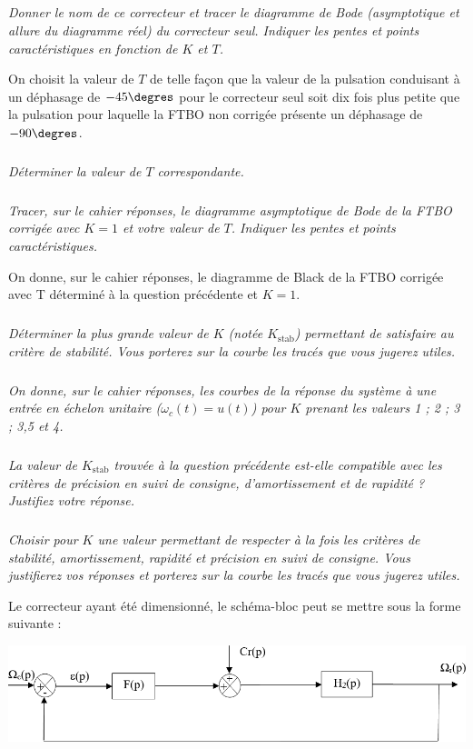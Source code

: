 \documentclass[10pt,fleqn]{article} %
\begin{document}
\subparagraph{}
\textit{Donner le nom de ce correcteur et tracer le diagramme de Bode (asymptotique et allure du diagramme réel) du correcteur seul. Indiquer les pentes et points caractéristiques en fonction de $K$ et $T$.}

On choisit la valeur de $T$ de telle façon que la valeur de la pulsation conduisant à un déphasage de $-45\degres$ pour le correcteur seul soit dix fois plus petite que la pulsation pour laquelle la FTBO non corrigée présente un déphasage de $-90\degres$.
\subparagraph{}
\textit{Déterminer la valeur de $T$ correspondante.}

\subparagraph{}
\textit{Tracer, sur le cahier réponses, le diagramme asymptotique de Bode de la FTBO corrigée avec $K = 1$ et votre valeur de $T$. Indiquer les pentes et points caractéristiques.}

On donne, sur le cahier réponses, le diagramme de Black de la FTBO corrigée avec T déterminé à la question précédente et $K = 1$.


\subparagraph{}
\textit{Déterminer la plus grande valeur de $K$ (notée $K_{\text{stab}}$) permettant de satisfaire au critère de stabilité. Vous porterez sur la courbe les tracés que vous jugerez utiles.}

\subparagraph{}
\textit{On donne, sur le cahier réponses, les courbes de la réponse du système à une entrée en échelon unitaire ($\omega_c(t) = u(t)$) pour $K$ prenant les valeurs 1 ; 2 ; 3 ; 3,5 et 4.}


\subparagraph{}
\textit{La valeur de $K_{\text{stab}}$ trouvée à la question précédente est-elle compatible avec les critères de précision en suivi de consigne, d'amortissement et de rapidité ? Justifiez votre réponse.}

\subparagraph{}
\textit{Choisir pour $K$ une valeur permettant de respecter à la fois les critères de stabilité, amortissement, rapidité et précision en suivi de consigne. Vous justifierez vos réponses et porterez sur la courbe les tracés que vous jugerez utiles.}

 
Le correcteur ayant été dimensionné, le schéma-bloc peut se mettre sous la forme suivante :
\begin{center}
\includegraphics[width=.8\linewidth]{images/e3a_09.png}
\end{center}
\end{document}
